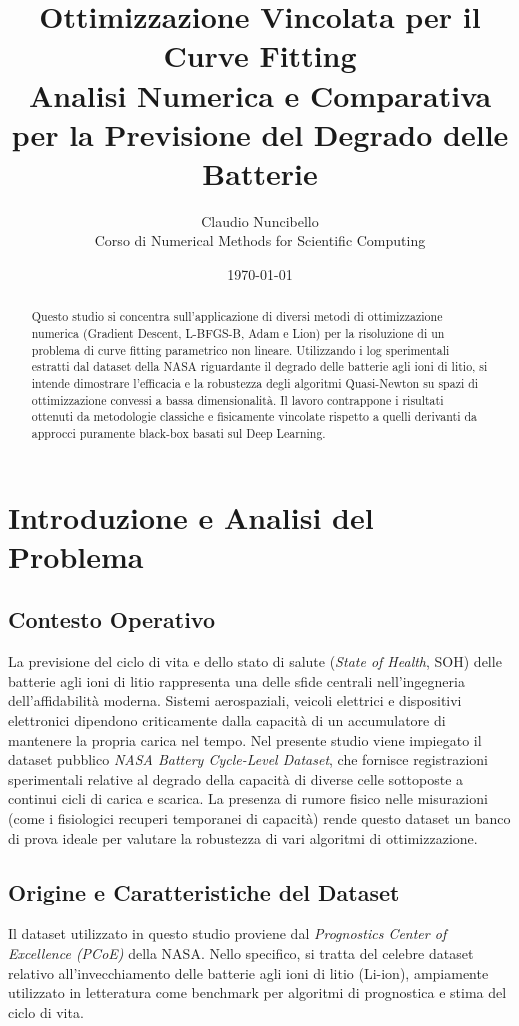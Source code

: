 \documentclass[11pt, a4paper]{article}
\title{\textbf{Ottimizzazione Vincolata per il Curve Fitting}\\
\large Analisi Numerica e Comparativa per la Previsione del Degrado delle Batterie}
\author{Claudio Nuncibello \\ \small Corso di Numerical Methods for Scientific Computing}
\date{\today}
\begin{document}
\maketitle

\begin{abstract}
Questo studio si concentra sull'applicazione di diversi metodi di ottimizzazione numerica (Gradient Descent, L-BFGS-B, Adam e Lion) per la risoluzione di un problema di curve fitting parametrico non lineare. Utilizzando i log sperimentali estratti dal dataset della NASA riguardante il degrado delle batterie agli ioni di litio, si intende dimostrare l'efficacia e la robustezza degli algoritmi Quasi-Newton su spazi di ottimizzazione convessi a bassa dimensionalità. Il lavoro contrappone i risultati ottenuti da metodologie classiche e fisicamente vincolate rispetto a quelli derivanti da approcci puramente black-box basati sul Deep Learning.
\end{abstract}

\tableofcontents
\newpage

\section{Introduzione e Analisi del Problema}

\subsection{Contesto Operativo}
La previsione del ciclo di vita e dello stato di salute (\textit{State of Health}, SOH) delle batterie agli ioni di litio rappresenta una delle sfide centrali nell'ingegneria dell'affidabilità moderna. Sistemi aerospaziali, veicoli elettrici e dispositivi elettronici dipendono criticamente dalla capacità di un accumulatore di mantenere la propria carica nel tempo. Nel presente studio viene impiegato il dataset pubblico \textit{NASA Battery Cycle-Level Dataset}, che fornisce registrazioni sperimentali relative al degrado della capacità di diverse celle sottoposte a continui cicli di carica e scarica. La presenza di rumore fisico nelle misurazioni (come i fisiologici recuperi temporanei di capacità) rende questo dataset un banco di prova ideale per valutare la robustezza di vari algoritmi di ottimizzazione.

\subsection{Origine e Caratteristiche del Dataset}
Il dataset utilizzato in questo studio proviene dal \textit{Prognostics Center of Excellence (PCoE)} della NASA. Nello specifico, si tratta del celebre dataset relativo all'invecchiamento delle batterie agli ioni di litio (Li-ion), ampiamente utilizzato in letteratura come benchmark per algoritmi di prognostica e stima del ciclo di vita.
\end{document}
